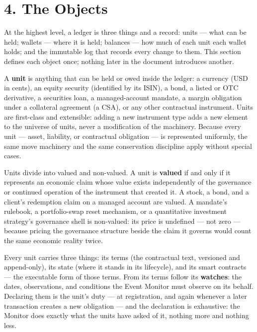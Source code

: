 \documentclass[11pt,a4paper]{article}
\newcommand{\clabel}[1]{\leavevmode\hypertarget{clause-#1}{}%
  \marginpar{\raggedright\scriptsize\ttfamily\textcolor{gray}{#1}}}
\begin{document}
\hypertarget{the-objects}{%
\section{4. The Objects}\label{the-objects}}

\clabel{C-4.1}At the highest level, a ledger is three things and a record: units ---
what can be held; wallets --- where it is held; balances --- how much of
each unit each wallet holds; and the immutable log that records every
change to them. This section defines each object once; nothing later in
the document introduces another.

\clabel{C-4.2}A \textbf{unit} is anything that can be held or owed inside the ledger:
a currency (USD in cents), an equity security (identified by its ISIN),
a bond, a listed or OTC derivative, a securities loan, a managed-account
mandate, a margin obligation under a collateral agreement (a CSA), or
any other contractual instrument. Units are first-class and extensible:
adding a new instrument type adds a new element to the universe of
units, never a modification of the machinery. Because every unit ---
asset, liability, or contractual obligation --- is represented
uniformly, the same move machinery and the same conservation discipline
apply without special cases.

\clabel{C-4.3}Units divide into valued and non-valued. A unit is \textbf{valued} if
and only if it represents an economic claim whose value exists
independently of the governance or continued operation of the instrument
that created it. A stock, a bond, and a client's redemption claim on a
managed account are valued. A mandate's rulebook, a portfolio-swap reset
mechanism, or a quantitative investment strategy's governance shell is
non-valued: its price is undefined --- not zero --- because pricing the
governance structure beside the claim it governs would count the same
economic reality twice.

\clabel{C-4.4}Every unit carries three things: its terms (the contractual text,
versioned and append-only), its state (where it stands in its
lifecycle), and its smart contracts --- the executable form of those
terms. From its terms follow its \textbf{watches}: the dates,
observations, and conditions the Event Monitor must observe on its
behalf. Declaring them is the unit's duty --- at registration, and again
whenever a later transaction creates a new obligation --- and the
declaration is exhaustive: the Monitor does exactly what the units have
asked of it, nothing more and nothing less.
\end{document}
